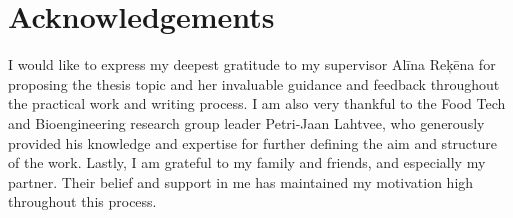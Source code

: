 \chapter*{Acknowledgements}
{}


I would like to express my deepest gratitude to my supervisor Alīna Reķēna for proposing the thesis topic and her invaluable guidance and feedback throughout the practical work and writing process. I am also very thankful to the Food Tech and Bioengineering research group leader Petri-Jaan Lahtvee, who generously provided his knowledge and expertise for further defining the aim and structure of the work. Lastly, I am grateful to my family and friends, and especially my partner. Their belief and support in me has maintained my motivation high throughout this process. 